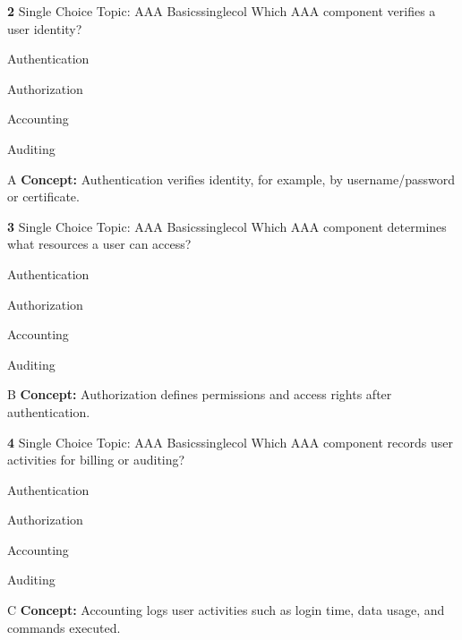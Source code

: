 \documentclass[10pt,a4paper]{article}
\begin{document}
\begin{qcard}{\color{white}\textbf{2} \hfill \small Single Choice \textbar{} Topic: AAA Basics}{singlecol}
Which AAA component verifies a user identity?

\begin{qoptions}
\item Authentication
\item Authorization
\item Accounting
\item Auditing
\end{qoptions}
\begin{explainbox}{A}
\textbf{Concept:} Authentication verifies identity, for example, by username/password or certificate.
\end{explainbox}
\end{qcard}

\begin{qcard}{\color{white}\textbf{3} \hfill \small Single Choice \textbar{} Topic: AAA Basics}{singlecol}
Which AAA component determines what resources a user can access?

\begin{qoptions}
\item Authentication
\item Authorization
\item Accounting
\item Auditing
\end{qoptions}
\begin{explainbox}{B}
\textbf{Concept:} Authorization defines permissions and access rights after authentication.
\end{explainbox}
\end{qcard}

\begin{qcard}{\color{white}\textbf{4} \hfill \small Single Choice \textbar{} Topic: AAA Basics}{singlecol}
Which AAA component records user activities for billing or auditing?

\begin{qoptions}
\item Authentication
\item Authorization
\item Accounting
\item Auditing
\end{qoptions}
\begin{explainbox}{C}
\textbf{Concept:} Accounting logs user activities such as login time, data usage, and commands executed.
\end{explainbox}
\end{qcard}
\end{document}
